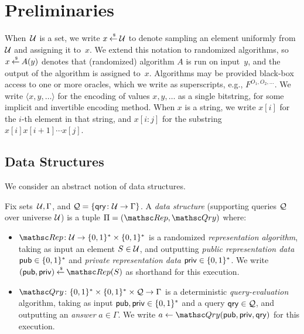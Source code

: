 \newcommand{\qry}{\mathsf{qry}}
\section{Preliminaries}

When~${\cal U}$ is a set, we write $x {\:\stackrel{{\scriptscriptstyle \hspace{0.2em}\$}} {\leftarrow}\:} {\cal U}$ to denote sampling
an element uniformly from~${\cal U}$ and assigning it to~$x$. We extend
this notation to randomized algorithms, so $x {\:\stackrel{{\scriptscriptstyle \hspace{0.2em}\$}} {\leftarrow}\:} A(y)$ denotes
that (randomized) algorithm $A$ is run on input~$y$, and the output
of the algorithm is assigned to~$x$. Algorithms may be provided
black-box access to one or more oracles, which we write as
superscripts, e.g., $F^{O_1,O_2,\ldots}$.  We write $\langle
x,y,\ldots \rangle$ for the encoding of values $x,y,\ldots$ as a
single bitstring, for some implicit and invertible encoding method.
When $x$ is a string, we write $x[i]$ for the $i$-th element in that
string, and $x[i:j]$ for the substring $x[i]x[i+1]\cdots x[j]$.

\subsection{Data Structures}

We consider an abstract notion of data structures.

\begin{definition} \rm
Fix sets~${\cal U}, \Gamma$, and $\calQ = \{\qry \colon \univ \to
\Gamma\}$. A \emph{data structure} (supporting queries ${\cal Q}$ over
universe ${\cal U}$) is a tuple $\setprim=(\Rep, \Qry)$ where:
\begin{itemize}
\item $\Rep \colon \univ \to \bits^* \times \bits^*$ is a
    randomized \emph{representation algorithm}, taking as input
    an element $S \in {\cal U}$,
    and outputting %
    \emph{public representation data} ${\sf pub} \in \{0,1\}^*$ and
    \emph{private representation data} ${\sf priv} \in \{0,1\}^*$.
    We write $(\pubaux,\privaux) \getsr \Rep(S)$ as shorthand
    for this execution.
\item $\Qry\colon \bits^* \times \bits^* \times \calQ \to
    \Gamma$ is a deterministic \emph{query-evaluation}
    algorithm, taking as input ${\sf pub},{\sf priv} \in \{0,1\}^*$
    and a query $\qry \in \calQ$, and outputting an
    \emph{answer} $a \in \Gamma$.  We write $a \gets
    \Qry(\pubaux,\privaux,\qry)$ for this execution. \hfill\dqed
\end{itemize}
\end{definition}

